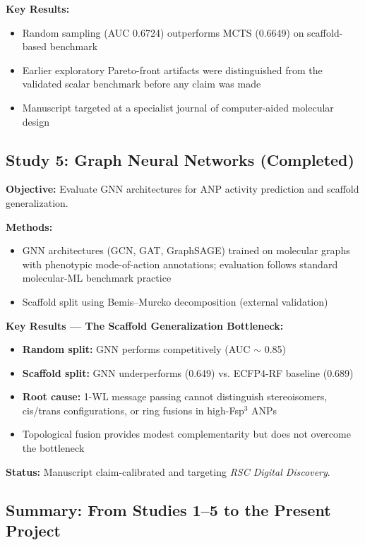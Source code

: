 \documentclass[11pt,a4paper]{article}
\begin{document}
\textbf{Key Results:}
\begin{itemize}
    \item Random sampling (AUC 0.6724) outperforms MCTS (0.6649) on scaffold-based benchmark
    \item Earlier exploratory Pareto-front artifacts were distinguished from the validated scalar benchmark before any claim was made
    \item Manuscript targeted at a specialist journal of computer-aided molecular design
\end{itemize}

\subsection{Study 5: Graph Neural Networks (Completed)}

\textbf{Objective:} Evaluate GNN architectures for ANP activity prediction and scaffold generalization.

\textbf{Methods:}
\begin{itemize}
    \item GNN architectures (GCN, GAT, GraphSAGE) trained on molecular graphs with phenotypic mode-of-action annotations; evaluation follows standard molecular-ML benchmark practice \cite{wu2018}
    \item Scaffold split using Bemis--Murcko decomposition \cite{bemis1996} (external validation)
\end{itemize}

\textbf{Key Results --- The Scaffold Generalization Bottleneck:}
\begin{itemize}
    \item \textbf{Random split:} GNN performs competitively (AUC $\sim$ 0.85)
    \item \textbf{Scaffold split:} GNN underperforms (0.649) vs. ECFP4-RF baseline (0.689)
    \item \textbf{Root cause:} 1-WL message passing cannot distinguish stereoisomers, cis/trans configurations, or ring fusions in high-Fsp$^3$ ANPs \cite{morris2019}
    \item Topological fusion provides modest complementarity but does not overcome the bottleneck
\end{itemize}

\textbf{Status:} Manuscript claim-calibrated and targeting \textit{RSC Digital Discovery}.

\subsection{Summary: From Studies 1--5 to the Present Project}
\end{document}
